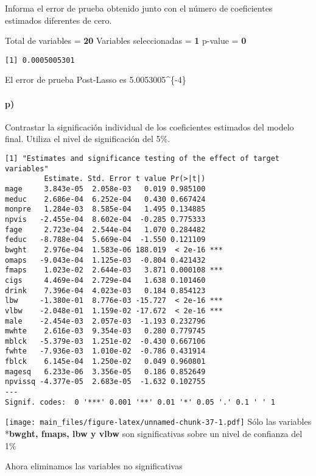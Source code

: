 \documentclass[]{article}
\let\oldparagraph\paragraph
\renewcommand{\paragraph}[1]{\oldparagraph{#1}\mbox{}}
\begin{document}
Informa el error de prueba obtenido junto con el número de coeficientes
estimados diferentes de cero.

Total de variables = \textbf{20} Variables seleccionadas = \textbf{1}
p-value = \textbf{0}

\begin{verbatim}
[1] 0.0005005301
\end{verbatim}

El error de prueba Post-Lasso es 5.0053005\^{}\{-4\}

\paragraph{p)}\label{p}

Contrastar la significación individual de los coeficientes estimados del
modelo final. Utiliza el nivel de significación del 5\%.

\begin{verbatim}
[1] "Estimates and significance testing of the effect of target variables"
         Estimate. Std. Error t value Pr(>|t|)    
mage     3.843e-05  2.058e-03   0.019 0.985100    
meduc    2.686e-04  6.252e-04   0.430 0.667424    
monpre   1.284e-03  8.585e-04   1.495 0.134885    
npvis   -2.455e-04  8.602e-04  -0.285 0.775333    
fage     2.723e-04  2.544e-04   1.070 0.284482    
feduc   -8.788e-04  5.669e-04  -1.550 0.121109    
bwght    2.976e-04  1.583e-06 188.019  < 2e-16 ***
omaps   -9.043e-04  1.125e-03  -0.804 0.421432    
fmaps    1.023e-02  2.644e-03   3.871 0.000108 ***
cigs     4.469e-04  2.729e-04   1.638 0.101460    
drink    7.396e-04  4.023e-03   0.184 0.854123    
lbw     -1.380e-01  8.776e-03 -15.727  < 2e-16 ***
vlbw    -2.048e-01  1.159e-02 -17.672  < 2e-16 ***
male    -2.454e-03  2.057e-03  -1.193 0.232796    
mwhte    2.616e-03  9.354e-03   0.280 0.779745    
mblck   -5.379e-03  1.251e-02  -0.430 0.667106    
fwhte   -7.936e-03  1.010e-02  -0.786 0.431914    
fblck    6.145e-04  1.250e-02   0.049 0.960801    
magesq   6.233e-06  3.356e-05   0.186 0.852649    
npvissq -4.377e-05  2.683e-05  -1.632 0.102755    
---
Signif. codes:  0 '***' 0.001 '**' 0.01 '*' 0.05 '.' 0.1 ' ' 1
\end{verbatim}

\texttt{[image: main\_files/figure-latex/unnamed-chunk-37-1.pdf]} Sólo
las variables *\textbf{bwght, fmaps, lbw y vlbw} son significativas
sobre un nivel de confianza del 1\%

Ahora eliminamos las variables no significativas
\end{document}
